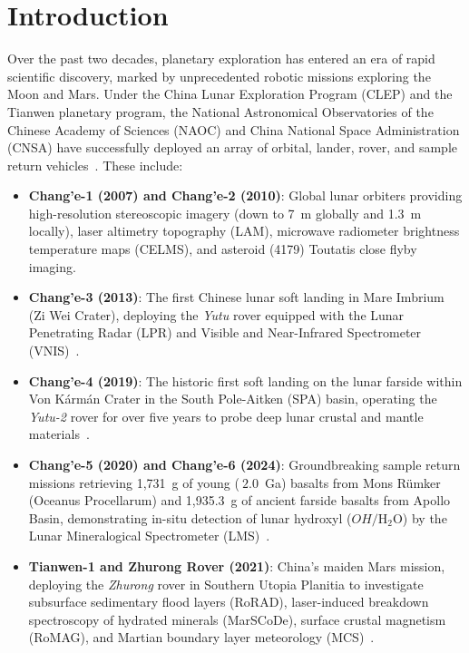\section{Introduction}

Over the past two decades, planetary exploration has entered an era of rapid scientific discovery, marked by unprecedented robotic missions exploring the Moon and Mars. Under the China Lunar Exploration Program (CLEP) and the Tianwen planetary program, the National Astronomical Observatories of the Chinese Academy of Sciences (NAOC) and China National Space Administration (CNSA) have successfully deployed an array of orbital, lander, rover, and sample return vehicles~\cite{jia2021scientific}. These include:
\begin{itemize}
    \item \textbf{Chang'e-1 (2007) and Chang'e-2 (2010)}: Global lunar orbiters providing high-resolution stereoscopic imagery (down to 7~m globally and 1.3~m locally), laser altimetry topography (LAM), microwave radiometer brightness temperature maps (CELMS), and asteroid (4179) Toutatis close flyby imaging.
    \item \textbf{Chang'e-3 (2013)}: The first Chinese lunar soft landing in Mare Imbrium (Zi Wei Crater), deploying the \textit{Yutu} rover equipped with the Lunar Penetrating Radar (LPR) and Visible and Near-Infrared Spectrometer (VNIS)~\cite{su2014lunar}.
    \item \textbf{Chang'e-4 (2019)}: The historic first soft landing on the lunar farside within Von K\'{a}rm\'{a}n Crater in the South Pole-Aitken (SPA) basin, operating the \textit{Yutu-2} rover for over five years to probe deep lunar crustal and mantle materials~\cite{lai2020first,li2020change,wimmer2020first}.
    \item \textbf{Chang'e-5 (2020) and Chang'e-6 (2024)}: Groundbreaking sample return missions retrieving 1,731~g of young ($~2.0$~Ga) basalts from Mons R\"{u}mker (Oceanus Procellarum) and 1,935.3~g of ancient farside basalts from Apollo Basin, demonstrating in-situ detection of lunar hydroxyl ($OH/\text{H}_2\text{O}$) by the Lunar Mineralogical Spectrometer (LMS)~\cite{li2022situ}.
    \item \textbf{Tianwen-1 and Zhurong Rover (2021)}: China's maiden Mars mission, deploying the \textit{Zhurong} rover in Southern Utopia Planitia to investigate subsurface sedimentary flood layers (RoRAD), laser-induced breakdown spectroscopy of hydrated minerals (MarSCoDe), surface crustal magnetism (RoMAG), and Martian boundary layer meteorology (MCS)~\cite{zhang2022layered,liu2022zhurong,peng2022mars}.
\end{itemize}

